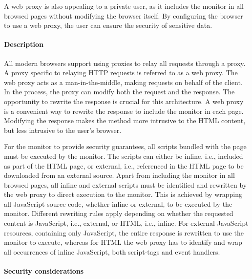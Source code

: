 \documentclass{llncs}
\newcommand{\todo}[1]{\colorbox{red}{\textcolor{white}{\sffamily\bfseries\scriptsize TODO}} \textcolor{red}{#1} \textcolor{red}{$\blacktriangleleft$}}
\begin{document}
A web proxy is also appealing to a private user, as it includes the monitor in all browsed pages without modifying 
the browser itself. By configuring the browser to use a web proxy, the user can ensure the security 
of sensitive data.

\paragraph{Description}
All modern browsers support using proxies to relay all requests through a proxy.
A proxy specific to relaying HTTP requests is referred to as a web proxy.
The web proxy acts as a man-in-the-middle, making 
requests on behalf of the client. In the process, the proxy can
modify both the request and the response. 
The opportunity to rewrite the response is crucial for this architecture.
A web proxy is a convenient way to rewrite the response to include 
the monitor in each page. Modifying the response makes the method more 
intrusive to the HTML content, but less intrusive to the user's browser. 

For the monitor to provide security guarantees, all scripts bundled with 
the page must be executed by the monitor. The scripts can either be inline, 
i.e., included as part of the HTML page, or external, i.e., referenced in the 
HTML page to be downloaded from an external source.
Apart from including the monitor in all browsed pages, all inline and external 
scripts must be identified and rewritten by the web proxy to direct execution to the monitor.
This is achieved by wrapping all JavaScript source code, whether inline or 
external, to be executed by the monitor.
Different rewriting rules apply depending on whether the 
requested content is JavaScript, i.e., external, or HTML, i.e., inline. 
For external 
JavaScript resources, containing only JavaScript, the entire response is rewritten to use the monitor to execute, whereas 
for HTML the web proxy has to identify and wrap all occurrences of inline 
JavaScript, both script-tags and event handlers.


\paragraph{Security considerations}
\end{document}
